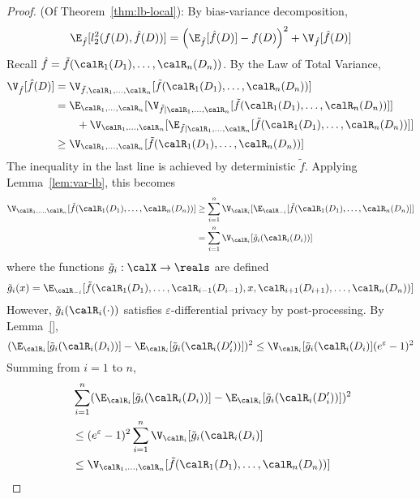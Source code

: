 \begin{proof}
  (Of Theorem~\ref{thm:lb-local}):
  By bias-variance decomposition,
  \begin{equation}
    \label{eq:bias-var-lb}
    \E_{\hat{f}}[l_2^2(f(D), \hat{f}(D))] = \left(\E_{\hat{f}}[\hat{f}(D)] -
    f(D)\right)^2 + \V_{\hat{f}}[\hat{f}(D)]
  \end{equation}
  Recall $\hat{f} = \tilde{f}(\calR_1(D_1),\ldots, \calR_n(D_n))$.
  By the Law of Total Variance,
  \begin{align*}
    \V_{\hat{f}}[\hat{f}(D)] &= \V_{\tilde{f},
      \calR_1,\ldots,\calR_n}[\tilde{f}(\calR_1(D_1),\ldots,\calR_n(D_n))] \\
      &=
      \E_{\calR_1,\ldots,\calR_n}[\V_{\tilde{f}\mid \calR_1,\ldots,\calR_n}
      [\tilde{f}(\calR_1(D_1),\ldots,\calR_n(D_n))]]
      \\
      &\qquad + \V_{\calR_1,\ldots,\calR_n}[\E_{\tilde{f}\mid \calR_1,\ldots,\calR_n}
      [\tilde{f}(\calR_1(D_1),\ldots,\calR_n(D_n))]] \\
      &\geq \V_{\calR_1,\ldots,\calR_n}[\tilde{f}(\calR_1(D_1),\ldots,
      \calR_n(D_n))]
  \end{align*}
  The inequality in the last line is achieved by deterministic $\tilde{f}$.
  Applying Lemma~\ref{lem:var-lb}, this becomes
  \begin{align*}
    \V_{\calR_1,\ldots,\calR_n}[\tilde{f}(\calR_1(D_1),\ldots,\calR_n(D_n))] 
    &\geq \sum_{i=1}^n
    \V_{\calR_i}[\E_{\calR_{-i}}[\tilde{f}(\calR_1(D_1),\ldots,\calR_n(D_n)]] \\
      &= \sum_{i=1}^n \V_{\calR_i}[\tilde{g}_i(\calR_i(D_i))]
  \end{align*}
  where the functions $\tilde{g}_i : \calX \rightarrow \reals$ are defined
  \[
    \tilde{g}_i(x) = \E_{\calR_{-i}}[\tilde{f}(\calR_1(D_1),\ldots,
    \calR_{i-1}(D_{i-1}),x,\calR_{i+1}(D_{i+1}),\ldots, \calR_n(D_n))]
  \]
  However, $\tilde{g}_i(\calR_{i}(\cdot))$ satisfies $\varepsilon$-differential
  privacy by post-processing.
  By Lemma~\ref{},
  \[
    ( \E_{\calR_i}[\tilde{g}_i(\calR_{i}(D_i))] -
    \E_{\calR_i}[\tilde{g}_i(\calR_{i}(D_i'))] )^2
    \leq \V_{\calR_i}[\tilde{g}_i(\calR_{i}(D_i)](e^\varepsilon-1)^2
  \]
  Summing from $i=1$ to $n$,
  \begin{align*}
    &\:\sum_{i=1}^n (\E_{\calR_i}[\tilde{g}_i(\calR_i(D_i))] - 
                  \E_{\calR_i}[\tilde{g}_i(\calR_i(D_i'))])^2 \\
    &\:\leq (e^\varepsilon-1)^2\sum_{i=1}^n
    \V_{\calR_i}[\tilde{g}_i(\calR_{i}(D_i)] \\
      &\:\leq \V_{\calR_1,\ldots,\calR_n}[\tilde{f}(\calR_1(D_1),\ldots,
      \calR_n(D_n))]
  \end{align*}


\end{proof}

